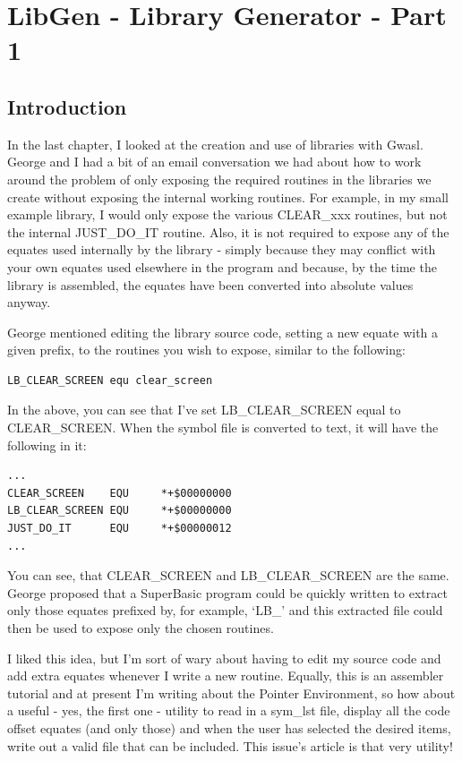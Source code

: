\chapter{LibGen -{} Library Generator -{} Part 1}

\section{Introduction}
\label{ch31-intro}%

In the last chapter, I looked at the creation and use of libraries
    with Gwasl. George and I had a bit of an
    email conversation we had about how to work around the problem of only
    exposing the required routines in the libraries we create without exposing
    the internal working routines. For example, in my small example library, I
    would only expose the various CLEAR\_xxx routines, but
    not the internal JUST\_DO\_IT routine. Also, it is not
    required to expose any of the equates used internally by the library -{}
    simply because they may conflict with your own equates used elsewhere in
    the program and because, by the time the library is assembled, the equates
    have been converted into absolute values anyway.

George mentioned editing the library source code, setting a new
    equate with a given prefix, to the routines you wish to expose, similar to
    the following:

\begin{lstlisting}[firstnumber=1,]
LB_CLEAR_SCREEN equ clear_screen
\end{lstlisting}

In the above, you can see that I've set
 LB\_CLEAR\_SCREEN equal to
 CLEAR\_SCREEN. When the symbol file is converted to
    text, it will have the following in it:

\begin{lstlisting}[firstnumber=1,]
...
CLEAR_SCREEN    EQU     *+$00000000
LB_CLEAR_SCREEN EQU     *+$00000000
JUST_DO_IT      EQU     *+$00000012
...
\end{lstlisting}

You can see, that CLEAR\_SCREEN and
 LB\_CLEAR\_SCREEN are the same. George proposed that a
    SuperBasic program could be quickly written to extract only those equates
    prefixed by, for example, `LB\_' and this extracted file could then be used
    to expose only the chosen routines.

I liked this idea, but I'm sort of wary about having to edit my
    source code and add extra equates whenever I write a new routine. Equally,
    this is an assembler tutorial and at present I'm writing about the Pointer
    Environment, so how about a useful -{} yes, the first one -{} utility to read
    in a sym\_lst file, display all the code offset equates (and only those)
    and when the user has selected the desired items, write out a valid file
    that can be included. This issue's article is that very utility!

